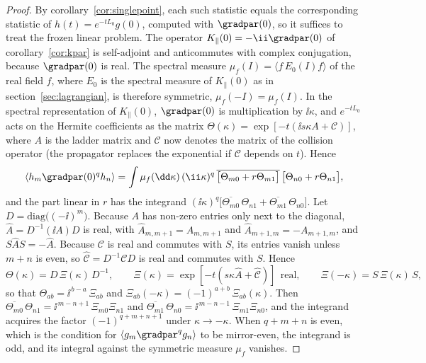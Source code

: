 \begin{proof}
By corollary~\ref{cor:singlepoint}, each such statistic equals the corresponding statistic of $h(t)=e^{-tL_0}g(0)$, computed with $\gradpar(0)$, so it suffices to treat the frozen linear problem. The operator $K_\parallel(0)=-\ii\gradpar(0)$ of corollary~\ref{cor:kpar} is self-adjoint and anticommutes with complex conjugation, because $\gradpar(0)$ is real. The spectral measure $\mu_f(I)=\langle f\,E_0(I)f\rangle$ of the real field $f$, where $E_0$ is the spectral measure of $K_\parallel(0)$ as in section~\ref{sec:lagrangian}, is therefore symmetric, $\mu_f(-I)=\mu_f(I)$. In the spectral representation of $K_\parallel(0)$, $\gradpar(0)$ is multiplication by $\ii\kappa$, and $e^{-tL_0}$ acts on the Hermite coefficients as the matrix $\Theta(\kappa)=\exp[-t(\ii s\kappa A+\mathcal C)]$, where $A$ is the ladder matrix and $\mathcal C$ now denotes the matrix of the collision operator (the propagator replaces the exponential if $\mathcal C$ depends on $t$). Hence
\begin{equation*}
  \langle h_m\gradpar(0)^qh_n\rangle=\int\mu_f(\dd\kappa)\,(\ii\kappa)^q\,
  \overline{\big[\Theta_{m0}+r\Theta_{m1}\big]}\,\big[\Theta_{n0}+r\Theta_{n1}\big],
\end{equation*}
and the part linear in $r$ has the integrand $(\ii\kappa)^q\big[\overline{\Theta_{m0}}\,\Theta_{n1}+\overline{\Theta_{m1}}\,\Theta_{n0}\big]$. Let $D=\mathrm{diag}\big((-\ii)^m\big)$. Because $A$ has non-zero entries only next to the diagonal, $\hat A=D^{-1}(\ii A)D$ is real, with $\hat A_{m,m+1}=A_{m,m+1}$ and $\hat A_{m+1,m}=-A_{m+1,m}$, and $S\hat AS=-\hat A$. Because $\mathcal C$ is real and commutes with $S$, its entries vanish unless $m+n$ is even, so $\hat{\mathcal C}=D^{-1}\mathcal CD$ is real and commutes with $S$. Hence
\begin{equation}\label{sym:similarity}
  \Theta(\kappa)=D\,\Xi(\kappa)\,D^{-1},\qquad
  \Xi(\kappa)=\exp[-t(s\kappa\hat A+\hat{\mathcal C})]\ \ \text{real},\qquad
  \Xi(-\kappa)=S\,\Xi(\kappa)\,S,
\end{equation}
so that $\Theta_{ab}=\ii^{\,b-a}\,\Xi_{ab}$ and $\Xi_{ab}(-\kappa)=(-1)^{a+b}\,\Xi_{ab}(\kappa)$. Then $\overline{\Theta_{m0}}\,\Theta_{n1}=\ii^{\,m-n+1}\,\Xi_{m0}\Xi_{n1}$ and $\overline{\Theta_{m1}}\,\Theta_{n0}=\ii^{\,m-n-1}\,\Xi_{m1}\Xi_{n0}$, and the integrand acquires the factor $(-1)^{q+m+n+1}$ under $\kappa\to-\kappa$. When $q+m+n$ is even, which is the condition for $\langle g_m\gradpar^qg_n\rangle$ to be mirror-even, the integrand is odd, and its integral against the symmetric measure $\mu_f$ vanishes.
\end{proof}

